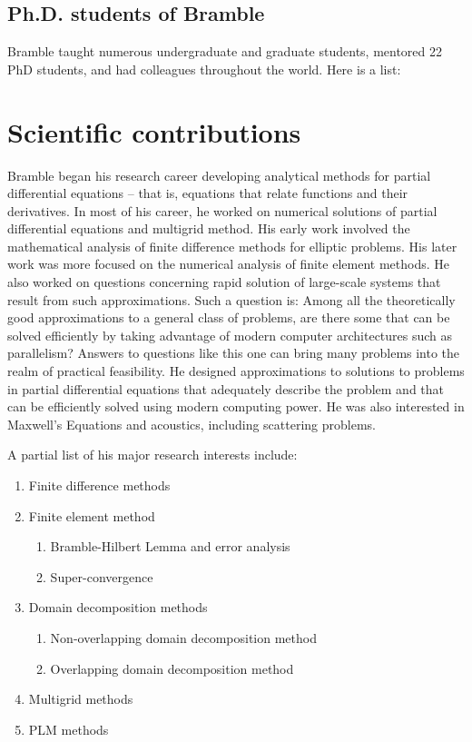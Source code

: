 \documentclass[CJK,11pt]{amsart}
\theoremstyle{definition}
\begin{document}
\begin{CJK*}{UTF8}{gbsn}
\subsection{Ph.D. students of Bramble}
Bramble taught numerous undergraduate and graduate students, mentored 22 PhD students, and had colleagues throughout the world. Here is a list:


\section{Scientific contributions}


Bramble began his research career developing analytical methods for partial differential equations – that is, equations that relate functions and their derivatives.  In most of his career, 
he worked on numerical solutions of partial differential equations and multigrid method. His early work involved the mathematical analysis of finite difference methods for elliptic problems. His later work was more focused on the numerical analysis of finite element methods.  He also worked on questions concerning rapid solution of large-scale systems that result from such approximations. Such a question is: Among all the theoretically good approximations to a general class of problems, are there some that can be solved efficiently by taking advantage of modern computer architectures such as parallelism? Answers to questions like this one can bring many problems into the realm of practical feasibility. He designed approximations to solutions to problems in partial differential equations that adequately describe the problem and that can be efficiently solved using modern computing power. He was also interested in Maxwell's Equations and acoustics, including scattering problems.

A partial list of his major research interests include:
\begin{enumerate}
\item Finite difference methods
\item Finite element method
\begin{enumerate}
\item Bramble-Hilbert Lemma and error analysis
\item Super-convergence
\end{enumerate}
\item Domain decomposition methods 
\begin{enumerate}
\item Non-overlapping domain decomposition method
\item Overlapping domain decomposition method
  \end{enumerate}
\item Multigrid methods
\item PLM methods 
\end{enumerate}

\end{CJK*}
\end{document}
